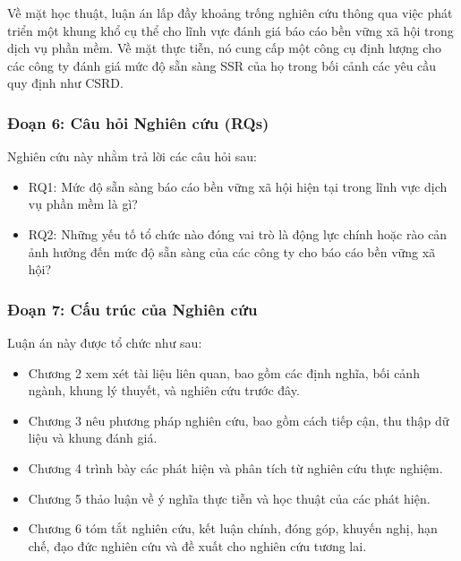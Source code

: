 Về mặt học thuật, luận án lấp đầy khoảng trống nghiên cứu thông qua 
việc phát triển một khung khổ cụ thể cho lĩnh vực đánh giá báo cáo bền vững xã hội
trong dịch vụ phần mềm. Về mặt thực tiễn, nó cung cấp một công cụ định lượng 
cho các công ty đánh giá mức độ sẵn sàng SSR của họ trong bối cảnh các yêu cầu quy định 
như CSRD.

\subsubsection{Đoạn 6: Câu hỏi Nghiên cứu (RQs)}
Nghiên cứu này nhằm trả lời các câu hỏi sau:
\begin{itemize}
    \item RQ1: Mức độ sẵn sàng báo cáo bền vững xã hội hiện tại 
    trong lĩnh vực dịch vụ phần mềm là gì?
    \item RQ2: Những yếu tố tổ chức nào đóng vai trò là động lực chính hoặc rào cản 
    ảnh hưởng đến mức độ sẵn sàng của các công ty cho báo cáo bền vững xã hội?
\end{itemize}

\subsubsection{Đoạn 7: Cấu trúc của Nghiên cứu}
Luận án này được tổ chức như sau:
\begin{itemize}
    \item Chương 2 xem xét tài liệu liên quan, bao gồm các định nghĩa, 
    bối cảnh ngành, khung lý thuyết, và nghiên cứu trước đây.
    \item Chương 3 nêu phương pháp nghiên cứu, bao gồm cách tiếp cận, 
    thu thập dữ liệu và khung đánh giá.
    \item Chương 4 trình bày các phát hiện và phân tích từ nghiên cứu thực nghiệm.
    \item Chương 5 thảo luận về ý nghĩa thực tiễn và học thuật của các phát hiện.
    \item Chương 6 tóm tắt nghiên cứu, kết luận chính, đóng góp, 
    khuyến nghị, hạn chế, đạo đức nghiên cứu và đề xuất cho nghiên cứu tương lai.
\end{itemize}